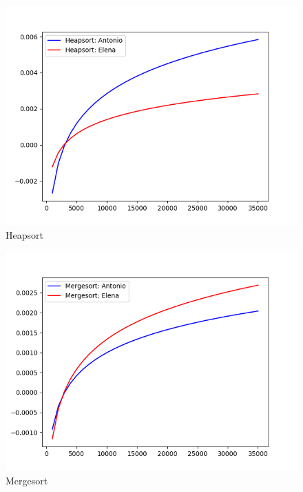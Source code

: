 \documentclass[11pt]{article}
\begin{document}
\begin{figure}
\centering
\includegraphics[scale=0.7]{../graficos/distintos/heapsort.png}
\caption{Heapsort}
\end{figure}

\begin{figure}
\centering
\includegraphics[scale=0.7]{../graficos/distintos/mergesort.png}
\caption{Mergesort}
\end{figure}
\end{document}
